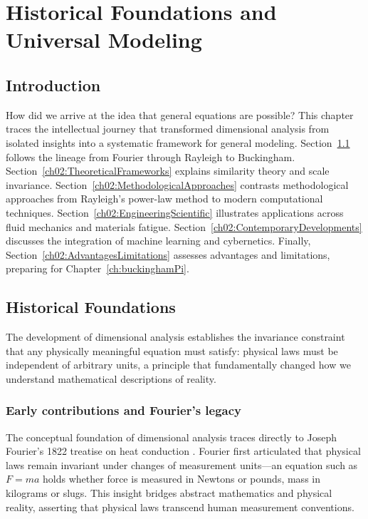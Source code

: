 \startcontents[chapter]
\chapter{Historical Foundations and Universal Modeling}\label{ch:historicalFoundations}
\minitocboxed

\section*{Introduction}
How did we arrive at the idea that general equations are possible? This chapter traces the intellectual journey that transformed dimensional analysis from isolated insights into a systematic framework for general modeling. Section~\ref{ch02:historicalFoundations} follows the lineage from Fourier through Rayleigh to Buckingham. Section~\ref{ch02:TheoreticalFrameworks} explains similarity theory and scale invariance. Section~\ref{ch02:MethodologicalApproaches} contrasts methodological approaches from Rayleigh's power-law method to modern computational techniques. Section~\ref{ch02:EngineeringScientific} illustrates applications across fluid mechanics and materials fatigue. Section~\ref{ch02:ContemporaryDevelopments} discusses the integration of machine learning and cybernetics. Finally, Section~\ref{ch02:AdvantagesLimitations} assesses advantages and limitations, preparing for Chapter~\ref{ch:buckinghamPi}.

\section{Historical Foundations}\label{ch02:historicalFoundations}

The development of dimensional analysis establishes the invariance constraint that any physically meaningful equation must satisfy: physical laws must be independent of arbitrary units, a principle that fundamentally changed how we understand mathematical descriptions of reality.

\subsection{Early contributions and Fourier's legacy}

The conceptual foundation of dimensional analysis traces directly to Joseph Fourier's 1822 treatise on heat conduction \cite{fourier1822}. Fourier first articulated that physical laws remain invariant under changes of measurement units—an equation such as $F = ma$ holds whether force is measured in Newtons or pounds, mass in kilograms or slugs. This insight bridges abstract mathematics and physical reality, asserting that physical laws transcend human measurement conventions.

